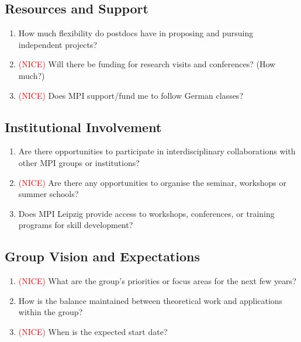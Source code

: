 \documentclass[12pt]{article}
\numberwithin{equation}{section}
\newcommand{\red}[1]{\textcolor{red}{#1}}
\begin{document}
\subsection{Resources and Support}
\begin{enumerate}

    \item How much flexibility do postdocs have in proposing and pursuing independent projects?

    \item \red{(NICE)} Will there be funding for research visits and conferences? (How much?)

    \item \red{(NICE)} Does MPI support/fund me to follow German classes? 
\end{enumerate}

\subsection{Institutional Involvement}
\begin{enumerate}
    \item Are there opportunities to participate in interdisciplinary collaborations with other MPI groups or institutions?

    \item \red{(NICE)} Are there any opportunities to organise the seminar,  workshops or summer schools?

    \item Does MPI Leipzig provide access to workshops, conferences, or training programs for skill development?
\end{enumerate}

\subsection{Group Vision and Expectations}
\begin{enumerate}
    \item \red{(NICE)} What are the group’s priorities or focus areas for the next few years?

    \item How is the balance maintained between theoretical work and applications within the group?

    \item \red{(NICE)} When is the expected start date?
\end{enumerate}
\end{document}
